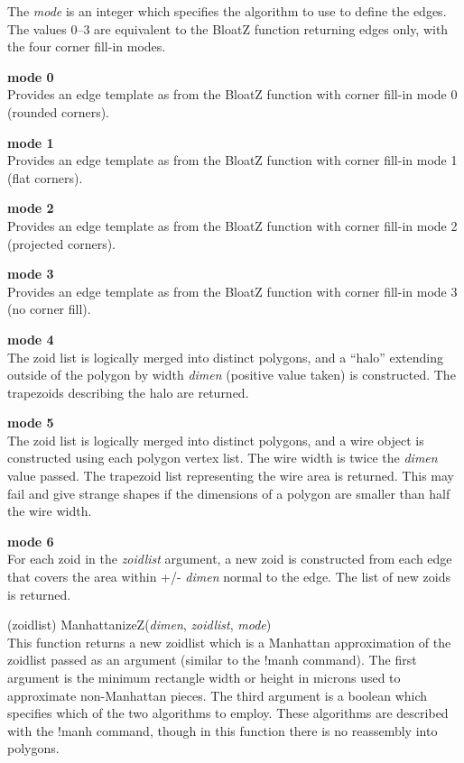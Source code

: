 \begin{description}
The {\it mode} is an integer which specifies the algorithm to use to
define the edges.  The values 0--3 are equivalent to the {\vt BloatZ}
function returning edges only, with the four corner fill-in modes.

\begin{description}
\item{\bf mode 0}\\
Provides an edge template as from the {\vt BloatZ} function with
corner fill-in mode 0 (rounded corners).

\item{\bf mode 1}\\
Provides an edge template as from the {\vt BloatZ} function with
corner fill-in mode 1 (flat corners).

\item{\bf mode 2}\\
Provides an edge template as from the {\vt BloatZ} function with
corner fill-in mode 2 (projected corners).

\item{\bf mode 3}\\
Provides an edge template as from the {\vt BloatZ} function with
corner fill-in mode 3 (no corner fill).

\item{\bf mode 4}\\
The zoid list is logically merged into distinct polygons, and a
``halo'' extending outside of the polygon by width {\it dimen}
(positive value taken) is constructed.  The trapezoids describing the
halo are returned.

\item{\bf mode 5}\\
The zoid list is logically merged into distinct polygons, and a wire
object is constructed using each polygon vertex list.  The wire width
is twice the {\it dimen} value passed.  The trapezoid list
representing the wire area is returned.  This may fail and give
strange shapes if the dimensions of a polygon are smaller than half
the wire width.

\item{\bf mode 6}\\
For each zoid in the {\it zoidlist} argument, a new zoid is
constructed from each edge that covers the area within +/- {\it dimen}
normal to the edge.  The list of new zoids is returned.
\end{description}

\item{(zoidlist) \vt ManhattanizeZ({\it dimen}, {\it zoidlist\/},
  {\it mode\/})}\\
This function returns a new zoidlist which is a Manhattan
approximation of the zoidlist passed as an argument (similar to the
{\cb !manh} command).  The first argument is the minimum rectangle
width or height in microns used to approximate non-Manhattan pieces. 
The third argument is a boolean which specifies which of the two
algorithms to employ.  These algorithms are described with the {\cb
!manh} command, though in this function there is no reassembly into
polygons.


\end{description}
